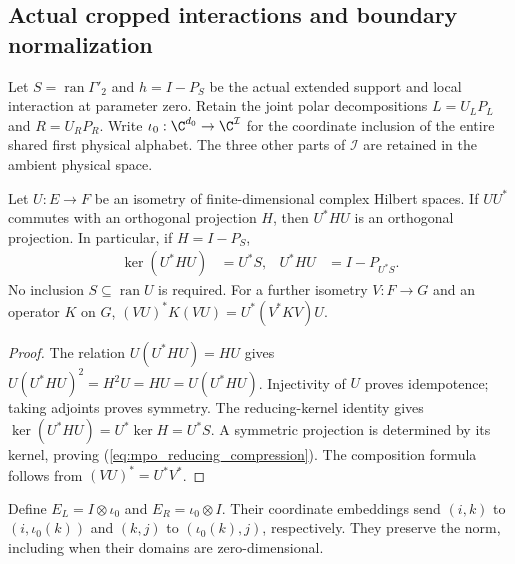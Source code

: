 
\subsection{Actual cropped interactions and boundary normalization}
\label{sec:mpo_joint_cropped_compression}

Let $S=\operatorname{ran}\Gamma'_2$ and $h=I-P_S$ be the actual
extended support and local interaction at parameter zero. Retain the
joint polar decompositions $L=U_LP_L$ and $R=U_RP_R$.
Write $\iota_0:\C^{d_0}\to\C^{\mathcal I}$ for the coordinate
inclusion of the entire shared first physical alphabet. The three other
parts of $\mathcal I$ are retained in the ambient physical space.

\begin{theorem}
    \label{thm:mpo_reducing_parent_compression}
    Let $U:E\to F$ be an isometry of finite-dimensional complex Hilbert
    spaces. If $UU^*$ commutes with an orthogonal projection $H$, then
    $U^*HU$ is an orthogonal projection. In particular, if $H=I-P_S$,
    \begin{align}
        \ker(U^*HU) & =U^*S,
                    & U^*HU  & =I-P_{U^*S}.
        \label{eq:mpo_reducing_compression}
    \end{align}
    No inclusion $S\subseteq\operatorname{ran}U$ is required.
    For a further isometry $V:F\to G$ and an operator $K$ on $G$,
    $(VU)^*K(VU)=U^*(V^*KV)U$.
\end{theorem}
\begin{proof}
    The relation $U(U^*HU)=HU$ gives
    $U(U^*HU)^2=H^2U=HU=U(U^*HU)$. Injectivity of $U$ proves
    idempotence; taking adjoints proves symmetry. The reducing-kernel
    identity gives $\ker(U^*HU)=U^*\ker H=U^*S$. A symmetric
    projection is determined by its kernel, proving
    (\ref{eq:mpo_reducing_compression}). The composition formula follows
    from $(VU)^*=U^*V^*$.
\end{proof}

\begin{definition}
    \label{def:mpo_joint_physical_crop}
    Define $E_L=I\otimes\iota_0$ and $E_R=\iota_0\otimes I$.
    Their coordinate embeddings send $(i,k)$ to $(i,\iota_0(k))$
    and $(k,j)$ to $(\iota_0(k),j)$, respectively. They preserve the
    norm, including when their domains are zero-dimensional.
\end{definition}

